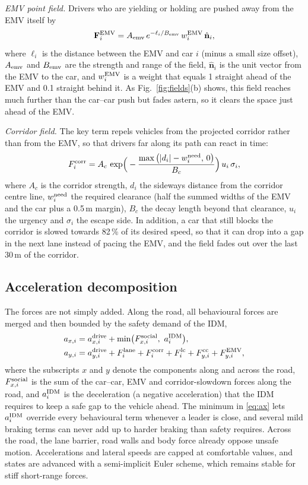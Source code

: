 \documentclass[conference,a4paper]{IEEEtran}
\begin{document}
\emph{EMV point field.} Drivers who are yielding or holding are pushed away from the EMV itself by
\begin{equation}
\mathbf F^{\rm EMV}_i=A_{\rm emv}\,e^{-\ell_i/B_{\rm emv}}\,w^{\rm EMV}_i\,\hat{\mathbf n}_i,
\label{eq:ev}
\end{equation}
where $\ell_i$ is the distance between the EMV and car $i$ (minus a small size offset), $A_{\rm emv}$ and $B_{\rm emv}$ are the strength and range of the field, $\hat{\mathbf n}_i$ is the unit vector from the EMV to the car, and $w^{\rm EMV}_i$ is a weight that equals 1 straight ahead of the EMV and 0.1 straight behind it. As Fig.~\ref{fig:fields}(b) shows, this field reaches much further than the car--car push but fades astern, so it clears the space just ahead of the EMV.

\emph{Corridor field.} The key term repels vehicles from the projected corridor rather than from the EMV, so that drivers far along its path can react in time:
\begin{equation}
F^{\rm corr}_i=A_c\,\exp\!\Big(-\frac{\max\big(|d_i|-w^{\rm need}_i,\,0\big)}{B_c}\Big)\,u_i\,\sigma_i,
\label{eq:corr}
\end{equation}
where $A_c$ is the corridor strength, $d_i$ the sideways distance from the corridor centre line, $w^{\rm need}_i$ the required clearance (half the summed widths of the EMV and the car plus a 0.5\,m margin), $B_c$ the decay length beyond that clearance, $u_i$ the urgency and $\sigma_i$ the escape side. In addition, a car that still blocks the corridor is slowed towards 82\,\% of its desired speed, so that it can drop into a gap in the next lane instead of pacing the EMV, and the field fades out over the last 30\,m of the corridor.

\subsection{Acceleration decomposition}
The forces are not simply added. Along the road, all behavioural forces are merged and then bounded by the safety demand of the IDM,
\begin{align}
a_{x,i}&=a^{\rm drive}_{x,i}+\min\!\big(F^{\rm social}_{x,i},\ a^{\rm IDM}_i\big),\label{eq:ax}\\
a_{y,i}&=a^{\rm drive}_{y,i}+F^{\rm lane}_i+F^{\rm corr}_i+F^{\rm lc}_i+F^{\rm cc}_{y,i}+F^{\rm EMV}_{y,i},\label{eq:ay}
\end{align}
where the subscripts $x$ and $y$ denote the components along and across the road, $F^{\rm social}_{x,i}$ is the sum of the car--car, EMV and corridor-slowdown forces along the road, and $a^{\rm IDM}_i$ is the deceleration (a negative acceleration) that the IDM requires to keep a safe gap to the vehicle ahead. The minimum in \eqref{eq:ax} lets $a^{\rm IDM}_i$ override every behavioural term whenever a leader is close, and several mild braking terms can never add up to harder braking than safety requires. Across the road, the lane barrier, road walls and body force already oppose unsafe motion. Accelerations and lateral speeds are capped at comfortable values, and states are advanced with a semi-implicit Euler scheme, which remains stable for stiff short-range forces.
\end{document}
